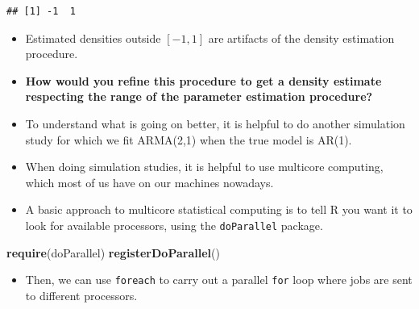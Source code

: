 \documentclass[]{article}
\newenvironment{Shaded}{\begin{snugshade}}{\end{snugshade}}
\newcommand{\KeywordTok}[1]{\textcolor[rgb]{0.13,0.29,0.53}{\textbf{#1}}}
\newcommand{\NormalTok}[1]{#1}
\providecommand{\tightlist}{%
  \setlength{\itemsep}{0pt}\setlength{\parskip}{0pt}}
\begin{document}
\begin{verbatim}
## [1] -1  1
\end{verbatim}

\begin{itemize}
\item Estimated densities outside $[-1,1]$ are artifacts of the density estimation procedure.
\item \textbf{How would you refine this procedure to get a density estimate respecting the range of the parameter estimation procedure? }
\item
  To understand what is going on better, it is helpful to do another
  simulation study for which we fit ARMA(2,1) when the true model is
  AR(1).
\item
  When doing simulation studies, it is helpful to use multicore
  computing, which most of us have on our machines nowadays.
\item
  A basic approach to multicore statistical computing is to tell R you
  want it to look for available processors, using the
  \texttt{doParallel} package.
\end{itemize}

\begin{Shaded}
\begin{Highlighting}[]
\KeywordTok{require}\NormalTok{(doParallel)}
\KeywordTok{registerDoParallel}\NormalTok{()}
\end{Highlighting}
\end{Shaded}

\begin{itemize}
\tightlist
\item
  Then, we can use \texttt{foreach} to carry out a parallel \texttt{for}
  loop where jobs are sent to different processors.
\end{itemize}
\end{document}

